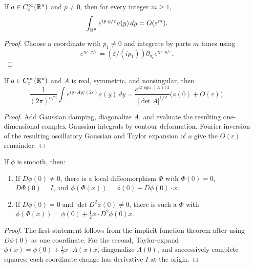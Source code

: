 \begin{lemma}
\label{lem:stationary-phase-linear-asymptotics}
If $a\in C_c^\infty(\mathbb{R}^n)$ and $p\ne0$, then for every integer $m\ge1$,
\[
\int_{\mathbb{R}^n}e^{ip\cdot y/\varepsilon}a(y)\,dy=O(\varepsilon^m).
\]
\end{lemma}

\begin{proof}
\sketch Choose a coordinate with $p_1\ne0$ and integrate by parts $m$ times
using
\[
e^{ip\cdot y/\varepsilon}=(\varepsilon/(ip_1))\partial_{y_1}
e^{ip\cdot y/\varepsilon}.
\]
\end{proof}

\begin{lemma}
\label{lem:stationary-phase-quadratic-asymptotics}
If $a\in C_c^\infty(\mathbb{R}^n)$ and $A$ is real, symmetric, and nonsingular, then
\[
\frac1{(2\pi)^{n/2}}\int e^{iy\cdot Ay/(2\varepsilon)}a(y)\,dy
=\frac{e^{i\pi\operatorname{sgn}(A)/4}}{|\det A|^{1/2}}
\big(a(0)+O(\varepsilon)\big).
\]
\end{lemma}

\begin{proof}
\sketch Add Gaussian damping, diagonalize $A$, and evaluate the resulting
one-dimensional complex Gaussian integrals by contour deformation. Fourier
inversion of the resulting oscillatory Gaussian and Taylor expansion of $a$
give the $O(\varepsilon)$ remainder.
\end{proof}

\begin{lemma}
\label{lem:stationary-phase-changing-coordinates}
If $\phi$ is smooth, then:
\begin{enumerate}
\item If $D\phi(0)\ne0$, there is a local diffeomorphism $\Phi$ with
$\Phi(0)=0$, $D\Phi(0)=I$, and
$\phi(\Phi(x))=\phi(0)+D\phi(0)\cdot x$.
\item If $D\phi(0)=0$ and $\det D^2\phi(0)\ne0$, there is such a $\Phi$ with
$\phi(\Phi(x))=\phi(0)+\frac12x\cdot D^2\phi(0)x$.
\end{enumerate}
\end{lemma}

\begin{proof}
\sketch The first statement follows from the implicit function theorem after
using $D\phi(0)$ as one coordinate. For the second, Taylor-expand
$\phi(x)=\phi(0)+\frac12x\cdot A(x)x$, diagonalize $A(0)$, and successively
complete squares; each coordinate change has derivative $I$ at the origin.
\end{proof}

